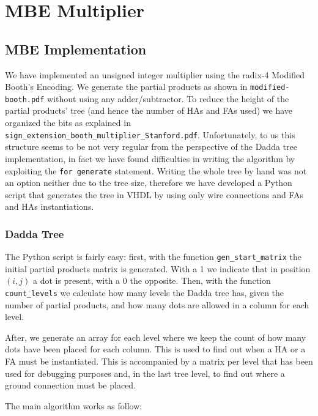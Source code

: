 \chapter{MBE Multiplier}

\section{MBE Implementation}

We have implemented an unsigned integer multiplier using the radix-4 Modified Booth's Encoding.
We generate the partial products as shown in \verb|modified-booth.pdf| without using any adder/subtractor.
To reduce the height of the partial products' tree (and hence the number of HAs and FAs used) we have
organized the bits as explained in \verb|sign_extension_booth_multiplier_Stanford.pdf|.
Unfortunately, to us this structure seems to be not very regular from the perspective of the Dadda tree implementation,
in fact we have found difficulties in writing the algorithm by exploiting the \verb|for generate| statement.
Writing the whole tree by hand was not an option neither due to the tree size, therefore we have developed
a Python script that generates the tree in VHDL by using only wire connections and FAs and HAs instantiations.

\subsection{Dadda Tree}

The Python script is fairly easy: first, with the function \verb|gen_start_matrix| the initial partial products
matrix is generated. With a 1 we indicate that in position $(i, j)$ a dot is present, with a 0 the opposite.
Then, with the function \verb|count_levels| we calculate how many levels the Dadda tree has, given the
number of partial products, and how many dots are allowed in a column for each level.

After, we generate an array for each level where we keep the count of how many dots have been placed for each column.
This is used to find out when a HA or a FA must be instantiated. This is accompanied by a matrix per level that has
been used for debugging purposes and, in the last tree level, to find out where a ground connection must be placed.

The main algorithm works as follow:

